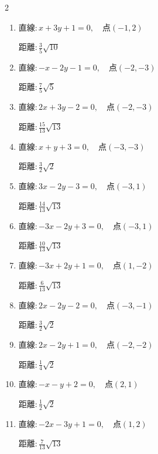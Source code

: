 \begin{multicols}{2}
\begin{enumerate}
        $\displaystyle 距離 : \frac{9}{13}\sqrt{13}$

  \item $直線:x+3y+1=0,\quad 点 ( -1, 2 )$

        $\displaystyle 距離 : \frac{3}{5}\sqrt{10}$

  \item $直線:-x-2y-1=0,\quad 点 ( -2, -3 )$

        $\displaystyle 距離 : \frac{7}{5}\sqrt{5}$

  \item $直線:2x+3y-2=0,\quad 点 ( -2, -3 )$

        $\displaystyle 距離 : \frac{15}{13}\sqrt{13}$

  \item $直線:x+y+3=0,\quad 点 ( -3, -3 )$

        $\displaystyle 距離 : \frac{3}{2}\sqrt{2}$

  \item $直線:3x-2y-3=0,\quad 点 ( -3, 1 )$

        $\displaystyle 距離 : \frac{14}{13}\sqrt{13}$

\columnbreak %

\resetques

  \item $直線:-3x-2y+3=0,\quad 点 ( -3, 1 )$

        $\displaystyle 距離 : \frac{10}{13}\sqrt{13}$

  \item $直線:-3x+2y+1=0,\quad 点 ( 1, -2 )$

        $\displaystyle 距離 : \frac{6}{13}\sqrt{13}$

  \item $直線:2x-2y-2=0,\quad 点 ( -3, -1 )$

        $\displaystyle 距離 : \frac{3}{2}\sqrt{2}$

  \item $直線:2x-2y+1=0,\quad 点 ( -2, -2 )$

        $\displaystyle 距離 : \frac{1}{4}\sqrt{2}$

  \item $直線:-x-y+2=0,\quad 点 ( 2, 1 )$

        $\displaystyle 距離 : \frac{1}{2}\sqrt{2}$

  \item $直線:-2x-3y+1=0,\quad 点 ( 1, 2 )$

        $\displaystyle 距離 : \frac{7}{13}\sqrt{13}$


\end{enumerate}
\end{multicols}
